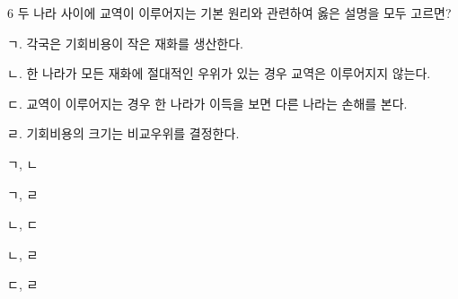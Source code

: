 \begin{question}{6}
두 나라 사이에 교역이 이루어지는 기본 원리와 관련하여 옳은 설명을 모두 고르면?
\begin{framedtext}
ㄱ. 각국은 기회비용이 작은 재화를 생산한다. \par
ㄴ. 한 나라가 모든 재화에 절대적인 우위가 있는 경우 교역은 이루어지지 않는다. \par
ㄷ. 교역이 이루어지는 경우 한 나라가 이득을 보면 다른 나라는 손해를 본다. \par
ㄹ. 기회비용의 크기는 비교우위를 결정한다. \par
\end{framedtext}
\begin{choices}
  \item ㄱ, ㄴ
  \item ㄱ, ㄹ
  \item ㄴ, ㄷ
  \item ㄴ, ㄹ
  \item ㄷ, ㄹ
\end{choices}
\end{question}
